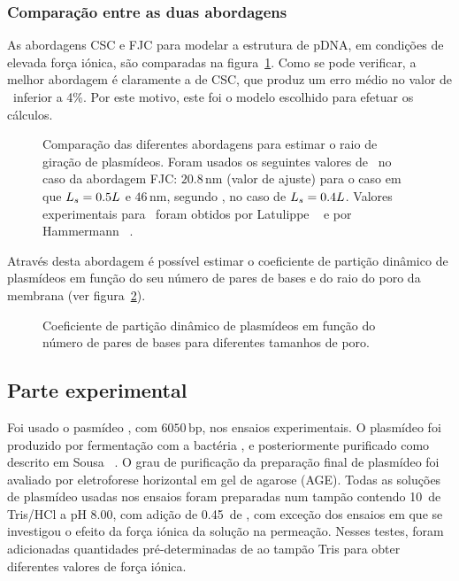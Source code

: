 \vspace{-3 mm}
\subsubsection{Comparação entre as duas abordagens}
As abordagens CSC e FJC para modelar a estrutura de pDNA, em condições de elevada força iónica, são comparadas na figura~\ref{fig:3art2}. Como se pode verificar, a melhor abordagem é claramente a de CSC, que produz um erro médio no valor de \raiogiracao\ inferior a 4\%. Por este motivo, este foi o modelo escolhido para efetuar os cálculos.
\begin{figure}[!b]
	\centering
	\setlength\figureheight{6cm} 
	\setlength\figurewidth{6cm}
	
	\caption[Comparação das diferentes abordagens para estimar \raiogiracao\ de plasmídeos]{Comparação das diferentes abordagens para estimar o raio de giração de plasmídeos. Foram usados os seguintes valores de \persissuper\ no caso da abordagem FJC: $20.8\,\mathrm{nm}$ (valor de ajuste) para o caso em que $L_{s}=0.5L$ e $46\,\mathrm{nm}$, segundo \cite{latusls}, no caso de $L_{s}=0.4L$. Valores experimentais para \raiogiracao\ foram obtidos por Latulippe \et\ \cite{latusls} e por Hammermann \et\ \cite{hammermann}.}
	\label{fig:3art2}
\end{figure}
Através desta abordagem é possível estimar o coeficiente de partição dinâmico de plasmídeos em função do seu número de pares de bases e do raio do poro da membrana (ver figura~\ref{fig:4art2}).
\begin{figure}
	\centering
	\setlength\figureheight{6cm} 
	\setlength\figurewidth{6cm}
	
	\caption[Coeficiente de partição dinâmico de plasmídeos em função de nbp]{Coeficiente de partição dinâmico de plasmídeos em função do número de pares de bases para diferentes tamanhos de poro.}
	\label{fig:4art2}
\end{figure}

\subsection{Parte experimental}
Foi usado o pasmídeo \pVAX, com $6050\,\mathrm{bp}$, nos ensaios experimentais.
%
%
%
O plasmídeo foi produzido por fermentação com a bactéria \ecolidh, e posteriormente purificado como descrito em Sousa \et\ \cite{sousabab}. O grau de purificação da preparação final de plasmídeo foi avaliado por eletroforese horizontal em gel de agarose (AGE).
%
%
%
Todas as soluções de plasmídeo usadas nos ensaios foram preparadas num tampão contendo 10\milimolar\ de Tris/HCl a pH 8.00, com adição de 0.45\molar\ de , com exceção dos ensaios em que se investigou o efeito da força iónica da solução na permeação.
%
%
Nesses testes, foram adicionadas quantidades pré-determinadas de  ao tampão Tris para obter diferentes valores de força iónica.


